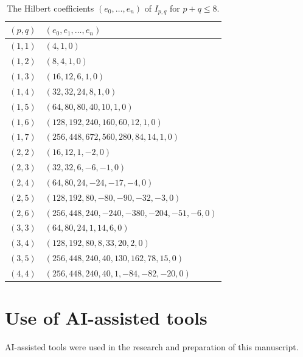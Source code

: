 \documentclass{amsart}
\theoremstyle{definition}
\theoremstyle{remark}
\numberwithin{equation}{section}
\begin{document}
\begin{table}[ht]
\caption{The Hilbert coefficients $(e_0,\dots,e_n)$ of $I_{p,q}$ for
$p+q\le8$.}\label{tab:coefficients}
\small
\begin{tabular}{@{}cl@{}}
\toprule
$(p,q)$ & $(e_0,e_1,\dots,e_n)$\\
\midrule
$(1,1)$ & $(4,1,0)$\\
$(1,2)$ & $(8,4,1,0)$\\
$(1,3)$ & $(16,12,6,1,0)$\\
$(1,4)$ & $(32,32,24,8,1,0)$\\
$(1,5)$ & $(64,80,80,40,10,1,0)$\\
$(1,6)$ & $(128,192,240,160,60,12,1,0)$\\
$(1,7)$ & $(256,448,672,560,280,84,14,1,0)$\\
$(2,2)$ & $(16,12,1,-2,0)$\\
$(2,3)$ & $(32,32,6,-6,-1,0)$\\
$(2,4)$ & $(64,80,24,-24,-17,-4,0)$\\
$(2,5)$ & $(128,192,80,-80,-90,-32,-3,0)$\\
$(2,6)$ & $(256,448,240,-240,-380,-204,-51,-6,0)$\\
$(3,3)$ & $(64,80,24,1,14,6,0)$\\
$(3,4)$ & $(128,192,80,8,33,20,2,0)$\\
$(3,5)$ & $(256,448,240,40,130,162,78,15,0)$\\
$(4,4)$ & $(256,448,240,40,1,-84,-82,-20,0)$\\
\bottomrule
\end{tabular}
\end{table}

\section*{Use of AI-assisted tools}
AI-assisted tools were used in the research and preparation of this manuscript.
\end{document}
